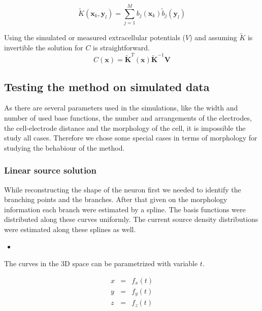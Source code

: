 \documentclass[12pt,a4paper]{article}
\begin{document}
\begin{equation}
\tilde{K}(\textbf{x}_k,\textbf{y}_l)= \sum_{j=1}^M b_j (\textbf{x}_k) \tilde{b}_j (\textbf{y}_l) 
\end{equation} 
 
Using the simulated or measured extracellular potentials ($V$) and assuming $\tilde{K}$ is invertible the solution for $C$ is straightforward.
 \begin{equation}
 C(\textbf{x})=\tilde{\textbf{K}}^T(\textbf{x})  
 \tilde{\textbf{K}}^{-1} \textbf{V}
 \end{equation}




\subsection{Testing the method on simulated data}
As there are several parameters used in the simulations, like the width and number of used base functions, the number and arrangements of the electrodes, the cell-electrode distance and the morphology of the cell, it is impossible the study all cases. Therefore we chose some special cases in terms of morphology for studying the behabiour of the method. 

\subsubsection{ Linear source solution }
While reconstructing the shape of the neuron first we needed to identify the branching points and the branches. After that given on the morphology information each branch were estimated by a spline. The basis functions were distributed along these curves uniformly. The current source density distributions were estimated along these splines as well. 



\begin{itemize}
\item 
\end{itemize}
The curves in the 3D space can be parametrized with variable $t$. 


\begin{eqnarray}
\displaystyle x &=& f_x(t)  \nonumber \\
\displaystyle y &=& f_y(t)  \\
\displaystyle z &=& f_z(t)  \nonumber 
\end{eqnarray}
\end{document}

